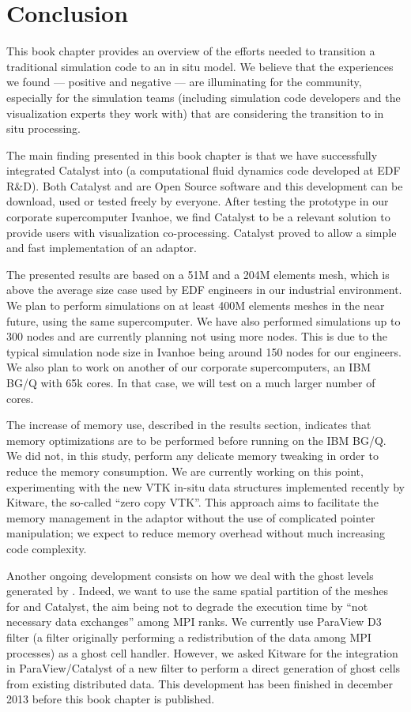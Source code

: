\section{Conclusion}
\label{sec:conclusion}

This book chapter provides an overview of the efforts needed to transition
a traditional simulation code to an in situ model.  We believe that the
experiences we found --- positive and negative --- are illuminating for the
community, especially for the simulation teams (including simulation code
developers and the visualization experts they work with) that are
considering the transition to in situ processing.

The main finding presented in this book chapter is that we have successfully
integrated Catalyst into \CS (a computational fluid dynamics code
developed at EDF R\&D). Both Catalyst and \CS are Open Source software
and this development can be download, used or tested freely by everyone. After
testing the prototype in our corporate supercomputer Ivanhoe, we find Catalyst to
be a relevant solution to provide \CS users with visualization
co-processing. Catalyst proved to allow a simple and fast implementation of an
adaptor.

The presented results are based on a 51M and a 204M elements mesh, which is
above the average size case used by EDF engineers in our industrial environment.
We plan to perform simulations on at least 400M elements meshes in the near
future, using the same supercomputer. We have also performed simulations up to
300 nodes and are currently planning not using more nodes. This is due to the
typical simulation node size in Ivanhoe being around 150 nodes for our
engineers. We also plan to work on another of our corporate supercomputers, an
IBM BG/Q with 65k cores. In that case, we will test on a much larger number of
cores.

The increase of memory use, described in the results section, indicates that
memory optimizations are to be performed before running on the IBM BG/Q. We did
not, in this study, perform any delicate memory tweaking in order to reduce the
memory consumption. We are currently working on this point, experimenting with
the new VTK in-situ data structures implemented recently by Kitware, the
so-called ``zero copy VTK''. This approach aims to facilitate the memory
management in the adaptor without the use of complicated pointer manipulation;
we expect to reduce memory overhead without much increasing code complexity.

Another ongoing development consists on how we deal with the ghost levels
generated by \CS. Indeed, we want to use the same spatial partition of
the meshes for \CS and Catalyst, the aim being not to degrade the
execution time by “not necessary data exchanges” among MPI ranks. We currently
use ParaView D3 filter (a filter originally performing a redistribution of the
data among MPI processes) as a ghost cell handler. However, we asked Kitware for
the integration in ParaView/Catalyst of a new filter to perform a direct
generation of ghost cells from existing distributed data. This development has
been finished in december 2013 before this book chapter is published.

